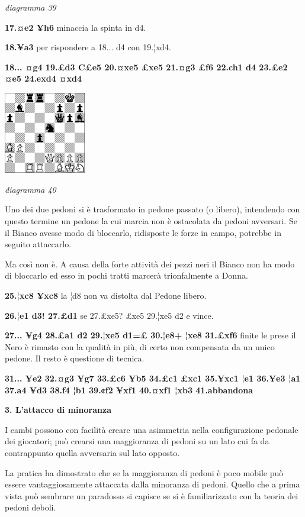 \documentclass[
]{article}
\begin{document}
\emph{diagramma 39}

\textbf{17.¤e2 ¥h6} minaccia la spinta in d4.

\textbf{18.¥a3} per rispondere a 18... d4 con 19.¦xd4.

\textbf{18... ¤g4 19.£d3 C£e5 20.¤xe5 £xe5 21.¤g3 £f6 22.ch1 d4 23.£e2
¤e5 24.exd4 ¤xd4}

\includegraphics[width=1.40972in,height=1.40972in]{vertopal_109f12be458a423d8f3cc838880eaea2/media/image40.png}

\emph{diagramma 40}

Uno dei due pedoni si è trasformato in pedone passato (o libero),
intendendo con questo termine un pedone la cui marcia non è ostacolata
da pedoni avversari. Se il Bianco avesse modo di bloccarlo, ridisposte
le forze in campo, potrebbe in seguito attaccarlo.

Ma così non è. A causa della forte attività dei pezzi neri il Bianco non
ha modo di bloccarlo ed esso in pochi tratti marcerà trionfalmente a
Donna.

\textbf{25.¦xc8 ¥xc8} la ¦d8 non va distolta dal Pedone libero.

\textbf{26.¦e1 d3! 27.£d1} se 27.£xe5? £xe5 29.¦xe5 d2 e vince.

\textbf{27... ¥g4 28.£a1 d2 29.¦xe5 d1=£ 30.¦e8+ ¦xe8 31.£xf6} finite le
prese il Nero è rimasto con la qualità in più, di certo non compensata
da un unico pedone. Il resto è questione di tecnica.

\textbf{31... ¥e2 32.¤g3 ¥g7 33.£c6 ¥b5 34.£c1 £xc1 35.¥xc1 ¦e1 36.¥e3
¦a1 37.a4 ¥d3 38.f4 ¦b1 39.¢f2 ¥xf1 40.¤xf1 ¦xb3 41.abbandona}

\textbf{3. L'attacco di minoranza}

I cambi possono con facilità creare una asimmetria nella configurazione
pedonale dei giocatori; può crearsi una maggioranza di pedoni su un lato
cui fa da contrappunto quella avversaria sul lato opposto.

La pratica ha dimostrato che se la maggioranza di pedoni è poco mobile
può essere vantaggiosamente attaccata dalla minoranza di pedoni. Quello
che a prima vista può sembrare un paradosso si capisce se si è
familiarizzato con la teoria dei pedoni deboli.
\end{document}

